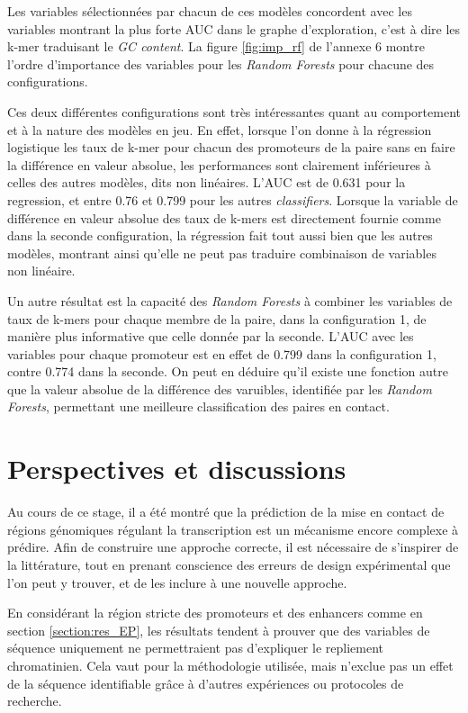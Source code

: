 \documentclass[french]{llncs}
\begin{document}
Les variables sélectionnées par chacun de ces modèles concordent avec les variables montrant la plus forte AUC dans le graphe d'exploration, c'est à dire les k-mer traduisant le \textit{GC content}. La figure \ref{fig:imp_rf} de l'annexe 6 montre l'ordre d'importance des variables pour les \textit{Random Forests} pour chacune des configurations.

Ces deux différentes configurations sont très intéressantes quant au comportement et à la nature des modèles en jeu. En effet, lorsque l'on donne à la régression logistique les taux de k-mer pour chacun des promoteurs de la paire sans en faire la différence en valeur absolue, les performances sont clairement inférieures à celles des autres modèles, dits non linéaires. L'AUC est de 0.631 pour la regression, et entre 0.76 et 0.799 pour les autres \textit{classifiers}. Lorsque la variable de différence en valeur absolue des taux de k-mers est directement fournie comme dans la seconde configuration, la régression fait tout aussi bien que les autres modèles, montrant ainsi qu'elle ne peut pas traduire combinaison de variables non linéaire.

Un autre résultat est la capacité des \textit{Random Forests} à combiner les variables de taux de k-mers pour chaque membre de la paire, dans la configuration 1, de manière plus informative que celle donnée par la seconde. L'AUC avec les variables pour chaque promoteur est en effet de 0.799 dans la configuration 1, contre 0.774 dans la seconde. On peut en déduire qu'il existe une fonction autre que la valeur absolue de la différence des varuibles, identifiée par les \textit{Random Forests}, permettant une meilleure classification des paires en contact.

\section{Perspectives et discussions}

Au cours de ce stage, il a été montré que la prédiction de la mise en contact de régions génomiques régulant la transcription est un mécanisme encore complexe à prédire. Afin de construire une approche correcte, il est nécessaire de s'inspirer de la littérature, tout en prenant conscience des erreurs de design expérimental que l'on peut y trouver, et de les inclure à une nouvelle approche.


En considérant la région stricte des promoteurs et des enhancers comme en section \ref{section:res_EP}, les résultats tendent à prouver que des variables de séquence uniquement ne permettraient pas d'expliquer le repliement chromatinien. Cela vaut pour la méthodologie utilisée, mais n'exclue pas un effet de la séquence identifiable grâce à d'autres expériences ou protocoles de recherche. 
\end{document}
